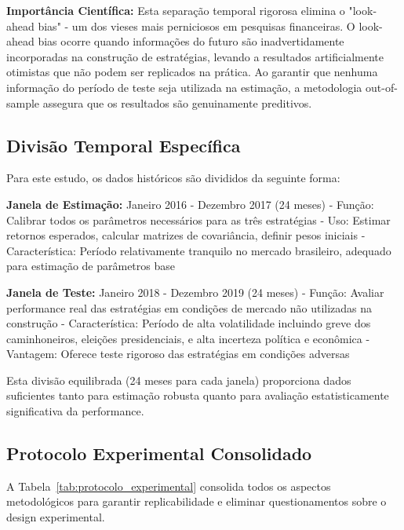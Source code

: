 \textbf{Importância Científica:} Esta separação temporal rigorosa elimina o "look-ahead bias" - um dos vieses mais perniciosos em pesquisas financeiras. O look-ahead bias ocorre quando informações do futuro são inadvertidamente incorporadas na construção de estratégias, levando a resultados artificialmente otimistas que não podem ser replicados na prática. Ao garantir que nenhuma informação do período de teste seja utilizada na estimação, a metodologia out-of-sample assegura que os resultados são genuinamente preditivos.

\subsection{Divisão Temporal Específica}

Para este estudo, os dados históricos são divididos da seguinte forma:

\textbf{Janela de Estimação:} Janeiro 2016 - Dezembro 2017 (24 meses)
- Função: Calibrar todos os parâmetros necessários para as três estratégias
- Uso: Estimar retornos esperados, calcular matrizes de covariância, definir pesos iniciais
- Característica: Período relativamente tranquilo no mercado brasileiro, adequado para estimação de parâmetros base

\textbf{Janela de Teste:} Janeiro 2018 - Dezembro 2019 (24 meses)
- Função: Avaliar performance real das estratégias em condições de mercado não utilizadas na construção
- Característica: Período de alta volatilidade incluindo greve dos caminhoneiros, eleições presidenciais, e alta incerteza política e econômica
- Vantagem: Oferece teste rigoroso das estratégias em condições adversas

Esta divisão equilibrada (24 meses para cada janela) proporciona dados suficientes tanto para estimação robusta quanto para avaliação estatisticamente significativa da performance.

\subsection{Protocolo Experimental Consolidado}

A Tabela~\ref{tab:protocolo_experimental} consolida todos os aspectos metodológicos para garantir replicabilidade e eliminar questionamentos sobre o design experimental.

